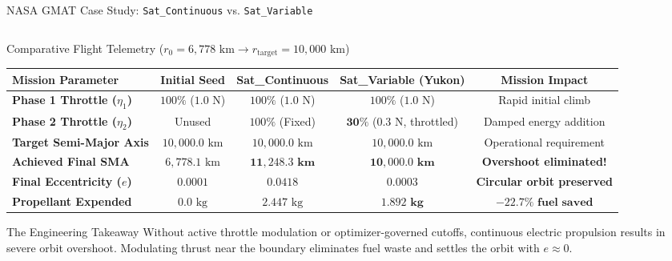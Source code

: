 \documentclass[aspectratio=169, 10pt]{beamer}
\begin{document}
\begin{frame}{NASA GMAT Case Study: \texttt{Sat\_Continuous} vs. \texttt{Sat\_Variable}}
    \begin{columns}[T]
        \begin{column}{0.54\textwidth}
            \begin{block}{Comparative Flight Telemetry ($r_0 = 6,778\text{ km} \to r_{\text{target}} = 10,000\text{ km}$)}
                \centering
                \vspace{1pt}
                \fontsize{5.2pt}{6.3pt}\selectfont
                \setlength{\tabcolsep}{2.5pt}
                \renewcommand{\arraystretch}{1.2}
                \begin{tabular}{lcccc}
                    \toprule
                    \textbf{Mission Parameter} & \textbf{Initial Seed} & \textbf{Sat\_Continuous} & \textbf{Sat\_Variable (Yukon)} & \textbf{Mission Impact} \\ \midrule
                    \textbf{Phase 1 Throttle ($\eta_1$)} & $100\%$ ($1.0\text{ N}$) & $100\%$ ($1.0\text{ N}$) & $100\%$ ($1.0\text{ N}$) & Rapid initial climb \\
                    \textbf{Phase 2 Throttle ($\eta_2$)} & Unused & $100\%$ (Fixed) & $\mathbf{30\%}$ ($0.3\text{ N}$, throttled) & Damped energy addition \\
                    \textbf{Target Semi-Major Axis}     & $10{,}000.0\text{ km}$ & $10{,}000.0\text{ km}$ & $10{,}000.0\text{ km}$ & Operational requirement \\
                    \textbf{Achieved Final SMA}         & $6{,}778.1\text{ km}$ & $\mathbf{11{,}248.3\text{ km}}$ & $\mathbf{10{,}000.0\text{ km}}$ & \textbf{Overshoot eliminated!} \\
                    \textbf{Final Eccentricity ($e$)}   & $0.0001$ & $\mathbf{0.0418}$ & $\mathbf{0.0003}$ & \textbf{Circular orbit preserved} \\
                    \textbf{Propellant Expended}        & $0.0\text{ kg}$ & $2.447\text{ kg}$ & $\mathbf{1.892\text{ kg}}$ & $\mathbf{-22.7\%\text{ fuel saved}}$ \\
                    \bottomrule
                \end{tabular}
                \vspace{2pt}
            \end{block}
            \vspace{-0.15cm}
            \begin{alertblock}{The Engineering Takeaway}
                \scriptsize
                Without active throttle modulation or optimizer-governed cutoffs, continuous electric propulsion results in severe orbit overshoot. Modulating thrust near the boundary eliminates fuel waste and settles the orbit with $e \approx 0$.
            \end{alertblock}
        \end{column}


\end{columns}
\end{frame}
\end{document}
